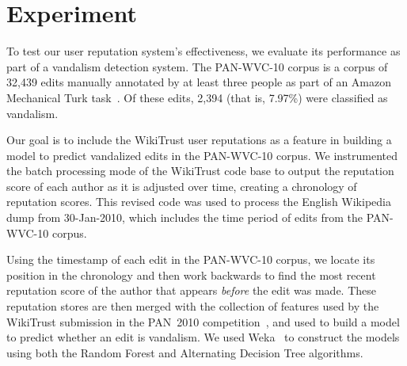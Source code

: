 \section{Experiment}

To test our user reputation system's effectiveness, we
evaluate its performance as part of a vandalism
detection system.
The PAN-WVC-10 corpus is a corpus of 32,439 edits manually
annotated by at least three people as part of an Amazon
Mechanical Turk task~\cite{Potthast2010a}.
Of these edits, 2,394 (that is, 7.97\%) were classified as vandalism.

Our goal is to include the WikiTrust user reputations as a
feature in building a model to predict vandalized edits in
the PAN-WVC-10 corpus.
We instrumented the batch processing mode of the WikiTrust
code base to output the reputation score of each author as
it is adjusted over time, creating a chronology of reputation scores.
This revised code was used to process the English Wikipedia
dump from 30-Jan-2010, which includes the time period of
edits from the PAN-WVC-10 corpus.

Using the timestamp of each edit in the PAN-WVC-10 corpus,
we locate its position in the chronology and then work backwards
to find the most recent reputation score of the author
that appears \textit{before} the edit was made.
These reputation stores are then merged with the collection
of features used by the WikiTrust submission in the PAN~2010
competition~\cite{Adler2010}, and used to build a model to predict
whether an edit is vandalism.
We used Weka~\cite{Weka09} to construct the models using both
the Random Forest and Alternating Decision Tree algorithms.

